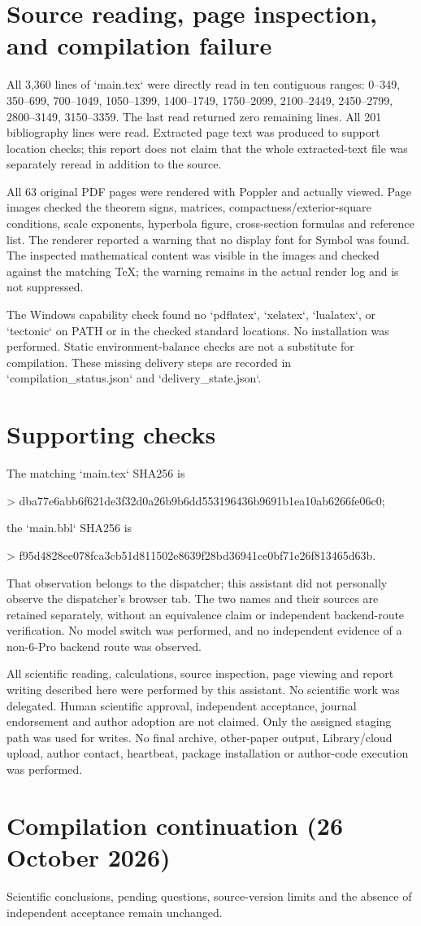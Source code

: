 \documentclass[10pt]{article}
\begin{document}
\section*{Source reading, page inspection, and compilation failure}
All 3,360 lines of `main.tex` were directly read in ten contiguous ranges: 0–349, 350–699, 700–1049, 1050–1399, 1400–1749, 1750–2099, 2100–2449, 2450–2799, 2800–3149, 3150–3359. The last read returned zero remaining lines. All 201 bibliography lines were read. Extracted page text was produced to support location checks; this report does not claim that the whole extracted-text file was separately reread in addition to the source.\par
All 63 original PDF pages were rendered with Poppler and actually viewed. Page images checked the theorem signs, matrices, compactness/exterior-square conditions, scale exponents, hyperbola figure, cross-section formulas and reference list. The renderer reported a warning that no display font for Symbol was found. The inspected mathematical content was visible in the images and checked against the matching TeX; the warning remains in the actual render log and is not suppressed.\par
The Windows capability check found no `pdflatex`, `xelatex`, `lualatex`, or `tectonic` on PATH or in the checked standard locations. No installation was performed. Static environment-balance checks are not a substitute for compilation. These missing delivery steps are recorded in `compilation\_status.json` and `delivery\_state.json`.\par
\section*{Supporting checks}
The matching `main.tex` SHA256 is\par
> dba77e6abb6f621de3f32d0a26b9b6dd553196436b9691b1ea10ab6266fe06c0;\par
the `main.bbl` SHA256 is\par
> f95d4828ee078fca3cb51d811502e8639f28bd36941ce0bf71e26f813465d63b.\par
That observation belongs to the dispatcher; this assistant did not personally observe the dispatcher’s browser tab. The two names and their sources are retained separately, without an equivalence claim or independent backend-route verification. No model switch was performed, and no independent evidence of a non-6-Pro backend route was observed.\par
All scientific reading, calculations, source inspection, page viewing and report writing described here were performed by this assistant. No scientific work was delegated. Human scientific approval, independent acceptance, journal endorsement and author adoption are not claimed. Only the assigned staging path was used for writes. No final archive, other-paper output, Library/cloud upload, author contact, heartbeat, package installation or author-code execution was performed.\par
\section*{Compilation continuation (26 October 2026)}
Scientific conclusions, pending questions, source-version limits and the absence of independent acceptance remain unchanged.\par
\end{document}
